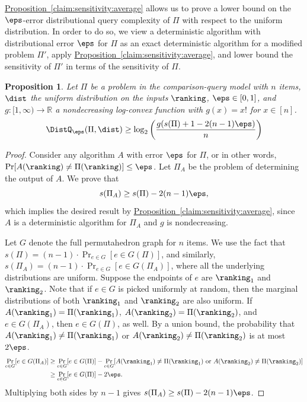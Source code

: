 \documentclass[11pt]{article}
\numberwithin{equation}{section}
\newtheorem{proposition}[theorem]{Proposition}
\theoremstyle{definition}
\theoremstyle{plain}
\newcommand{\expref}[2]{\hyperref[#2]{#1~\ref{#2}}}
\begin{document}
\expref{Proposition}{claim:sensitivity:average} allows us to prove a lower bound on the $\eps$-error distributional query complexity of $\Pi$ with respect to the uniform distribution. In order to do so, we view a deterministic algorithm with distributional error $\eps$ for $\Pi$ as an exact deterministic algorithm for a modified problem $\Pi'$, apply \expref{Proposition}{claim:sensitivity:average}, and lower bound the sensitivity of $\Pi'$ in terms of the sensitivity of $\Pi$.

\begin{proposition}
	\label{claim:sensitivity:partial}
	Let $\Pi$ be a problem in the comparison-query model with $n$ items, $\dist$ the uniform distribution on the inputs $\ranking$, $\eps\in [0,1]$, and $g: [1,\infty) \to \mathbb{R}$ a nondecreasing log-convex function with $g(x) = x!$ for $x \in [n]$.
	\begin{equation}\label{eq:prop:sensitivity:randomized}
	\DistQ_{\eps}(\Pi,\dist)\ge \log_2 \left(\frac{g(s(\Pi)+1-2(n-1)\eps)}{n}\right)
	\end{equation}
\end{proposition}

\begin{proof}
	Consider any algorithm $A$ with error $\eps$ for $\Pi$, or in other words, $\Pr[A(\ranking)\neq\Pi(\ranking)] \le \eps$. Let $\Pi_A$ be the problem of determining the output of $A$. We prove that 
	\[ s(\Pi_A)\ge s(\Pi)-2(n-1)\eps,\]
	which implies the desired result by \expref{Proposition}{claim:sensitivity:average}, since $A$ is a deterministic algorithm for $\Pi_A$ and $g$ is nondecreasing.
	
	Let $G$ denote the full permutahedron graph for $n$ items. We use the fact that $s(\Pi)=(n-1)\cdot \Pr_{e\in G}[e \in G(\Pi)]$, and similarly, $s(\Pi_A)=(n-1)\cdot \Pr_{e\in G}[e \in G(\Pi_A)]$, where all the underlying distributions are uniform. Suppose the endpoints of $e$ are $\ranking_1$ and $\ranking_2$. Note that if $e \in G$ is picked uniformly at random, then the marginal distributions of both $\ranking_1$ and $\ranking_2$ are also uniform. If $A(\ranking_1)=\Pi(\ranking_1)$, $A(\ranking_2)=\Pi(\ranking_2)$, and $e\in G(\Pi_A)$, then $e\in G(\Pi)$, as well. By a union bound, the probability that $A(\ranking_1) \neq \Pi(\ranking_1)$ or $A(\ranking_2) \neq \Pi(\ranking_2)$ is at most $2\eps$. 
	\begin{align*}
		\Pr_{e\in G}[e\in G(\Pi_A)] &\ge \Pr_{e\in G}[e\in G(\Pi)] - \Pr_{e\in G}[A(\ranking_1)\neq \Pi(\ranking_1)\text{ or }A(\ranking_2)\neq \Pi(\ranking_2)]\\
		&\ge \Pr_{e\in G}[e\in G(\Pi)] - 2\eps.
	\end{align*}
	Multiplying both sides by $n-1$ gives $s(\Pi_A)\ge s(\Pi)-2(n-1)\eps$.
\end{proof}
\end{document}
